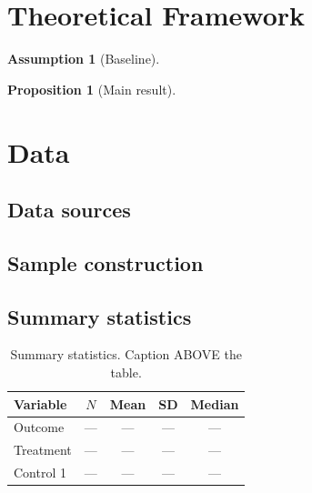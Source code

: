 \documentclass[11pt,a4paper]{article}
\newtheorem{proposition}{Proposition}
\newtheorem{assumption}{Assumption}
\begin{document}
\section{Theoretical Framework}
\label{sec:theory}

\begin{assumption}[Baseline]\label{ass:baseline}
\end{assumption}

\begin{proposition}[Main result]\label{prop:main}
\end{proposition}

\section{Data}
\label{sec:data}

\subsection{Data sources}

\subsection{Sample construction}

\subsection{Summary statistics}

\begin{table}[t]
\caption{Summary statistics. Caption ABOVE the table.}
\label{tab:summary}
\centering
\begin{tabular}{lcccc}
\toprule
Variable      & $N$ & Mean & SD   & Median \\
\midrule
Outcome       & --- & ---  & ---  & ---    \\
Treatment     & --- & ---  & ---  & ---    \\
Control 1     & --- & ---  & ---  & ---    \\
\bottomrule
\end{tabular}
\end{table}
\end{document}
